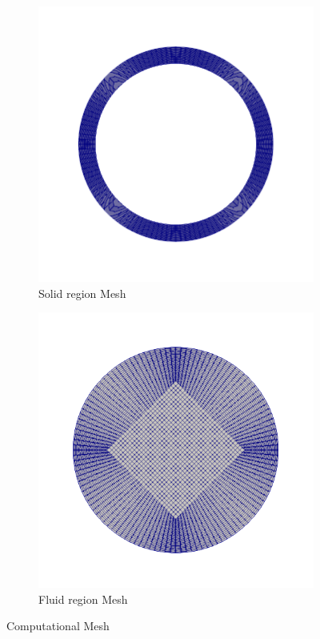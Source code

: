 \documentclass{article}
\begin{document}
    \begin{figure}[ht]
        \centering
        \begin{subfigure}[b]{0.4\linewidth}
            \includegraphics[width=\linewidth]{solidzone.png}
            \caption{Solid region Mesh}
        \end{subfigure}
        \begin{subfigure}[b]{0.4\linewidth}
            \includegraphics[width=\linewidth]{fluidzone.png}
            \caption{Fluid region Mesh}
        \end{subfigure}
        \caption{Computational Mesh}
        \label{fig:Mesh}
    \end{figure}
\end{document}

